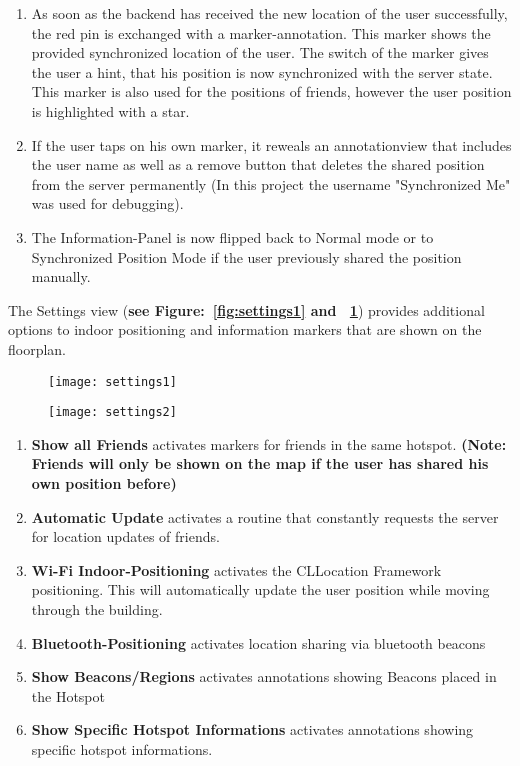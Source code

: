 \begin{enumerate}
\item As soon as the backend has received the new location of the user successfully, the red pin is exchanged with a marker-annotation. This marker shows the provided synchronized location of the user. The switch of the marker gives the user a hint, that his position is now synchronized with the server state. This marker is also used for the positions of friends, however the user position is highlighted with a star.
\item If the user taps on his own marker, it reweals an annotationview that includes the user name as well as a remove button that deletes the shared position from the server permanently (In this project the username "Synchronized Me" was used for debugging).

\item The Information-Panel is now flipped back to Normal mode or to Synchronized Position Mode if the user previously shared the position manually.
\end{enumerate}


The Settings view (\textbf{see Figure:~\ref{fig:settings1} and ~\ref{fig:settings2}}) provides additional options to indoor positioning and information markers that are shown on the floorplan.

\begin{figure}
\centering
\begin{minipage}{.5\textwidth}
  \centering
  \texttt{[image: settings1]}
  \label{fig:settings1}
\end{minipage}%
\begin{minipage}{.5\textwidth}
  \centering
  \texttt{[image: settings2]}
  \label{fig:settings2}
\end{minipage}
\end{figure}

\begin{enumerate}
\item \textbf{Show all Friends} activates markers for friends in the same hotspot. \textbf{(Note: Friends will only be shown on the map if the user has shared his own position before)}
\item \textbf{Automatic Update} activates a routine that constantly requests the server for location updates of friends.
\item \textbf{Wi-Fi Indoor-Positioning} activates the CLLocation Framework positioning. This will automatically update the user position while moving through the building.
\item \textbf{Bluetooth-Positioning} activates location sharing via bluetooth beacons
\item \textbf{Show Beacons/Regions} activates annotations showing Beacons placed in the Hotspot
\item \textbf{Show Specific Hotspot Informations} activates annotations showing specific hotspot informations.
\end{enumerate}

